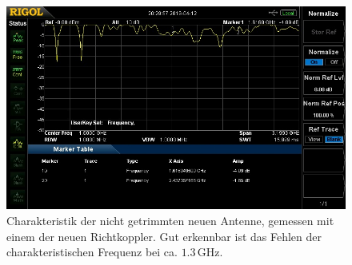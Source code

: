 \documentclass[titlepage,11pt,a4paper,ngerman]{article}
\begin{document}
\begin{figure}[ht]
	\includegraphics[scale=0.075]{Bilder/koppler_klein.jpg}
	\centering
	\caption{Charakteristik der nicht getrimmten neuen Antenne, gemessen mit einem der neuen Richtkoppler. Gut erkennbar ist das Fehlen der charakteristischen Frequenz bei ca. $1.3\,$GHz.}
	\label{Koppler_klein}
\end{figure}
\end{document}
